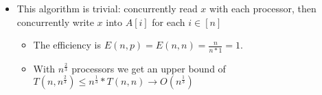 \documentclass{article}
\begin{document}
\begin{itemize}
  \item This algorithm is trivial: concurrently read $x$ with each processor, then concurrently write $x$ into $A[i]$ for each $i \in [n]$
  \begin{itemize}
    \item The efficiency is $E(n,p) = E(n,n) = \frac{n}{n*1} = 1$.
    \item With $n^{\frac{2}{3}}$ processors we get an upper bound of $T(n, n^{\frac{2}{3}}) \leq n^{\frac{1}{3}}*T(n,n) \rightarrow O(n^{\frac{1}{3}})$
  \end{itemize}
\end{itemize}
\end{document}
